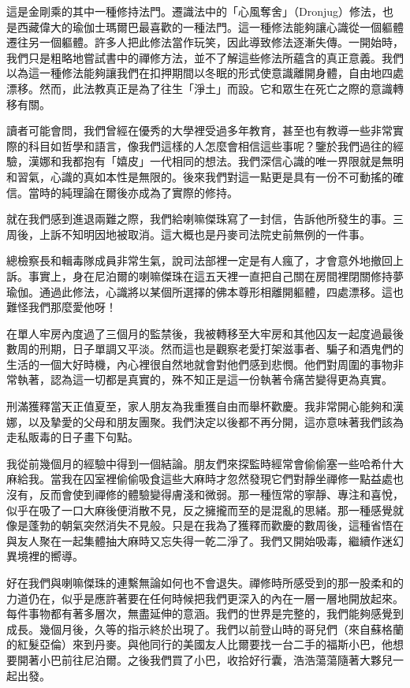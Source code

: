 這是金剛乘的其中一種修持法門。遷識法中的「心風奪舍」（Dronjug）修法，也是西藏偉大的瑜伽士瑪爾巴最喜歡的一種法門。這一種修法能夠讓心識從一個軀體遷往另一個軀體。許多人把此修法當作玩笑，因此導致修法逐漸失傳。一開始時，我們只是粗略地嘗試書中的禪修方法，並不了解這些修法所蘊含的真正意義。我們以為這一種修法能夠讓我們在扣押期間以冬眠的形式使意識離開身體，自由地四處漂移。然而，此法教真正是為了往生「淨土」而設。它和眾生在死亡之際的意識轉移有關。

讀者可能會問，我們曾經在優秀的大學裡受過多年教育，甚至也有教導一些非常實際的科目如哲學和語言，像我們這樣的人怎麼會相信這些事呢？鑒於我們過往的經驗，漢娜和我都抱有「嬉皮」一代相同的想法。我們深信心識的唯一界限就是無明和習氣，心識的真如本性是無限的。後來我們對這一點更是具有一份不可動搖的確信。當時的純理論在爾後亦成為了實際的修持。

就在我們感到進退兩難之際，我們給喇嘛傑珠寫了一封信，告訴他所發生的事。三周後，上訴不知明因地被取消。這大概也是丹麥司法院史前無例的一件事。

總檢察長和輯毒隊成員非常生氣，說司法部裡一定是有人瘋了，才會意外地撤回上訴。事實上，身在尼泊爾的喇嘛傑珠在這五天裡一直把自己關在房間裡閉關修持夢瑜伽。通過此修法，心識將以某個所選擇的佛本尊形相離開軀體，四處漂移。這也難怪我們那麼愛他呀！

在單人牢房內度過了三個月的監禁後，我被轉移至大牢房和其他囚友一起度過最後數周的刑期，日子單調又平淡。然而這也是觀察老愛打架滋事者、騙子和酒鬼們的生活的一個大好時機，內心裡很自然地就會對他們感到悲憫。他們對周圍的事物非常執著，認為這一切都是真實的，殊不知正是這一份執著令痛苦變得更為真實。

刑滿獲釋當天正值夏至，家人朋友為我重獲自由而舉杯歡慶。我非常開心能夠和漢娜，以及摯愛的父母和朋友團聚。我們決定以後都不再分開，這亦意味著我們該為走私販毒的日子畫下句點。

我從前幾個月的經驗中得到一個結論。朋友們來探監時經常會偷偷塞一些哈希什大麻給我。當我在囚室裡偷偷吸食這些大麻時才忽然發現它們對靜坐禪修一點益處也沒有，反而會使到禪修的體驗變得膚淺和微弱。那一種恆常的寧靜、專注和喜悅，似乎在吸了一口大麻後便消散不見，反之擁攏而至的是混亂的思緒。那一種感覺就像是蓬勃的朝氣突然消失不見般。只是在我為了獲釋而歡慶的數周後，這種省悟在與友人聚在一起集體抽大麻時又忘失得一乾二淨了。我們又開始吸毒，繼續作迷幻異境裡的嚮導。

好在我們與喇嘛傑珠的連繫無論如何也不會退失。禪修時所感受到的那一股柔和的力道仍在，似乎是應許著要在任何時候把我們更深入的內在一層一層地開放起來。每件事物都有著多層次，無盡延伸的意涵。我們的世界是完整的，我們能夠感覺到成長。幾個月後，久等的指示終於出現了。我們以前登山時的哥兒們（來自蘇格蘭的紅髮亞倫）來到丹麥。與他同行的美國友人比爾要找一台二手的福斯小巴，他想要開著小巴前往尼泊爾。之後我們買了小巴，收拾好行囊，浩浩蕩蕩隨著大夥兒一起出發。

